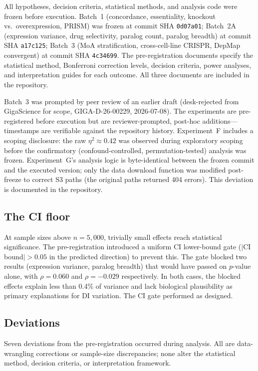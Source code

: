 \documentclass[11pt]{article}
\begin{document}
All hypotheses, decision criteria, statistical methods, and analysis
code were frozen before execution.  Batch~1
(concordance, essentiality, knockout vs.\ overexpression, PRISM) was
frozen at commit SHA \texttt{0d07a01}; Batch~2A (expression variance,
drug selectivity, paralog count, paralog breadth) at commit SHA
\texttt{a17c125}; Batch~3 (MoA stratification, cross-cell-line CRISPR,
DepMap convergent) at commit SHA \texttt{4c34699}.  The pre-registration
documents specify the statistical method, Bonferroni correction levels,
decision criteria, power analyses, and interpretation guides for each
outcome.  All three documents are included in the repository.

Batch~3 was prompted by peer review of an earlier draft (desk-rejected
from GigaScience for scope, GIGA-D-26-00229, 2026-07-08).  The
experiments are pre-registered before execution but are
reviewer-prompted, post-hoc additions---timestamps are verifiable
against the repository history.  Experiment~F includes a scoping
disclosure: the raw $\eta^2 \approx 0.42$ was observed during
exploratory scoping before the confirmatory (confound-controlled,
permutation-tested) analysis was frozen.  Experiment~G's analysis logic
is byte-identical between the frozen commit and the executed version;
only the data download function was modified post-freeze to correct S3
paths (the original paths returned 404 errors).  This deviation is
documented in the repository.

\subsection{The CI floor}

At sample sizes above $n = 5{,}000$, trivially small effects reach
statistical significance.  The pre-registration introduced a uniform
CI lower-bound gate ($|$CI bound$| > 0.05$ in the predicted direction)
to prevent this.  The gate blocked two results (expression variance, paralog breadth) that
would have passed on $p$-value alone, with $\rho = 0.060$ and
$\rho = -0.029$
respectively.  In both cases, the blocked effects explain less than
0.4\% of variance and lack biological plausibility as primary
explanations for DI variation.  The CI gate performed as designed.

\subsection{Deviations}

Seven deviations from the pre-registration occurred during analysis.
All are data-wrangling corrections or sample-size discrepancies; none
alter the statistical method, decision criteria, or interpretation
framework.
\end{document}
